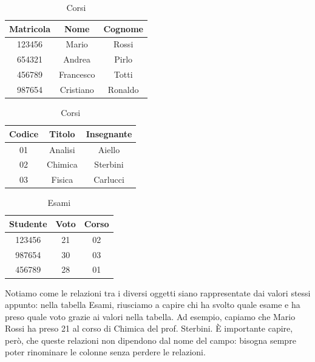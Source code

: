 \documentclass[11pt, a4paper, titlepage, oneside]{scrbook}
\begin{document}
\begin{table}[!t]
  \centering
  \begin{minipage}[t]{0.48\textwidth}
    \centering
      \caption*{Studenti}
    \small
    \begin{tabular}{|c|c|c|}
      \hline
      \textbf{Matricola} & \textbf{Nome} & \textbf{Cognome} \\
      \hline
      123456 & Mario & Rossi  \\
      654321 & Andrea & Pirlo  \\
      456789 & Francesco & Totti \\
      987654 & Cristiano & Ronaldo \\
      \hline
    \end{tabular}
  \end{minipage}\hfill
  \begin{minipage}[t]{0.48\textwidth}
    \centering
    \small
      \caption*{Corsi}
    \begin{tabular}{|c|c|c|}
      \hline
      \textbf{Codice} & \textbf{Titolo} & \textbf{Insegnante} \\
      \hline
      01 & Analisi & Aiello \\
      02 & Chimica & Sterbini \\
      03 & Fisica & Carlucci \\
      \hline
    \end{tabular}
  \end{minipage}
\end{table}

\begin{table}[!t]
    \centering
    \small
      \caption*{Esami}
    \begin{tabular}{|c|c|c|}
      \hline
      \textbf{Studente} & \textbf{Voto} & \textbf{Corso} \\
      \hline
      123456 & 21 & 02 \\
      987654 & 30 & 03 \\
      456789 & 28 & 01 \\
      \hline
    \end{tabular}
\end{table}

Notiamo come le relazioni tra i diversi oggetti siano rappresentate dai valori stessi appunto: nella tabella Esami, riusciamo a capire chi ha svolto quale esame e ha preso quale voto grazie ai valori nella tabella. Ad esempio, capiamo che Mario Rossi ha preso 21 al corso di Chimica del prof. Sterbini. È importante capire, però, che queste relazioni non dipendono dal nome del campo: bisogna sempre poter rinominare le colonne senza perdere le relazioni.
\end{document}
